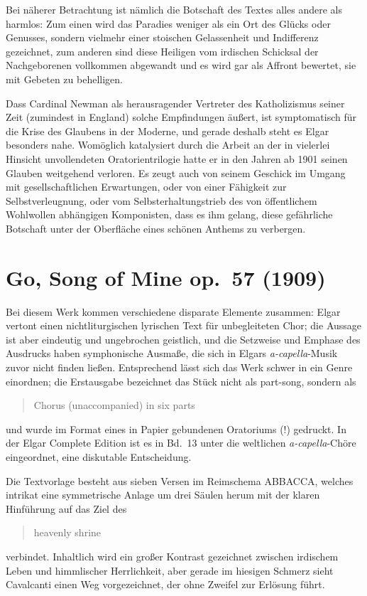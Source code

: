 \documentclass[a4paper,11pt,open=any]{scrbook}
\newcommand{\engquote}[1]{\foreignblockquote{english}{#1}}
\begin{document}
Bei näherer Betrachtung ist nämlich die Botschaft des Textes alles andere
als harmlos: Zum einen wird das Paradies weniger als ein Ort des Glücks
oder Genusses, sondern vielmehr einer stoischen Gelassenheit und Indifferenz
gezeichnet, zum anderen sind diese Heiligen vom irdischen Schicksal der
Nachgeborenen vollkommen abgewandt und es wird gar als Affront bewertet,
sie mit Gebeten zu behelligen.

Dass Cardinal Newman als herausragender Vertreter des Katholizismus seiner
Zeit (zumindest in England) solche Empfindungen äußert, ist symptomatisch
für die Krise des Glaubens in der Moderne, und gerade deshalb steht es
Elgar besonders nahe.  Womöglich katalysiert durch die Arbeit an der in
vielerlei Hinsicht unvollendeten Oratorientrilogie hatte er in den Jahren
ab 1901 seinen Glauben weitgehend verloren\cite[Zu Elgars Verhältnis zur
Religion siehe][]{adams, rushton-religion}.  Es zeugt auch von seinem
Geschick im Umgang mit gesellschaftlichen Erwartungen, oder von einer
Fähigkeit zur Selbstverleugnung, oder vom Selbsterhaltungstrieb des
von öffentlichem Wohlwollen abhängigen Komponisten, dass es ihm gelang,
diese gefährliche Botschaft unter der Oberfläche eines schönen Anthems
zu verbergen.

\section{Go, Song of Mine \textmd{op.~57 (1909)}}
Bei diesem Werk kommen verschiedene disparate Elemente zusammen: Elgar
vertont einen nichtliturgischen lyrischen Text für unbegleiteten Chor;
die Aussage ist aber eindeutig und ungebrochen geistlich, und die Setzweise
und Emphase des Ausdrucks haben symphonische Ausmaße, die sich in Elgars
\textit{a-capella}-Musik zuvor nicht finden ließen.  Entsprechend lässt
sich das Werk schwer in ein Genre einordnen; die Erstausgabe bezeichnet
das Stück nicht als part-song, sondern als \engquote{Chorus (unaccompanied)
in six parts} und wurde im Format eines in Papier gebundenen Oratoriums (!)
gedruckt\cite[Brief an A.~H. Littleton vom 27.~Juni 1909, in][Bd.~2, S.~724]
{elgar-publ}. In der Elgar Complete Edition ist es in Bd.~13\cite{ece13}
unter die weltlichen \textit{a-capella}-Chöre eingeordnet, eine diskutable
Entscheidung.

Die Textvorlage besteht aus sieben Versen im Reimschema \textsf{ABBACCA},
welches intrikat eine symmetrische Anlage um drei Säulen herum mit der
klaren Hinführung auf das Ziel des \engquote{heavenly shrine} verbindet.
Inhaltlich wird ein großer Kontrast gezeichnet zwischen irdischem Leben
und himmlischer Herrlichkeit, aber gerade im hiesigen Schmerz sieht
Cavalcanti einen Weg vorgezeichnet, der ohne Zweifel zur Erlösung führt.
\end{document}
